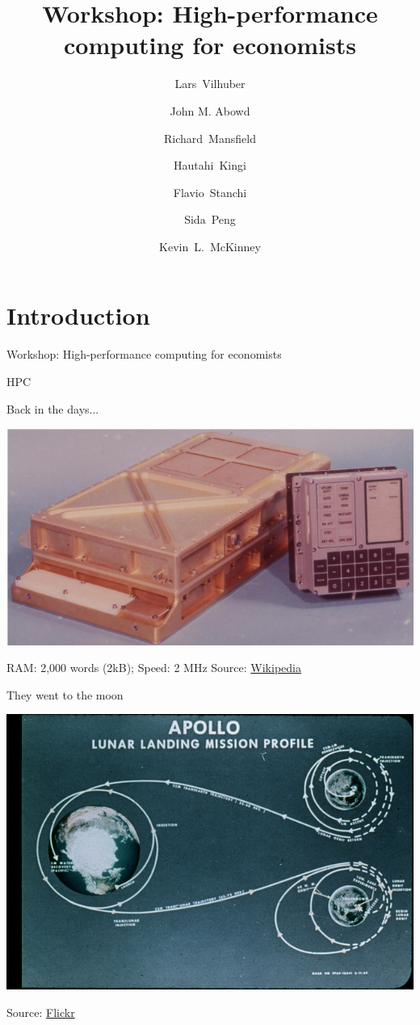 \documentclass[xcolor=table,compress]{beamer}
\title[Computing for Economists]{Workshop: High-performance computing for economists}
\author[Vilhuber, Abowd, Mansfield, McKinney]{%
  Lars~Vilhuber\inst{1} \and
  John M. Abowd\inst{1} \and
  Richard~Mansfield\inst{1} \and
  Hautahi~Kingi\inst{1} \and
  Flavio~Stanchi\inst{1} \and
  Sida~Peng\inst{1} \and
  Kevin~L.~McKinney %
}
\institute[Cornell]{
  \inst{1}%
   Cornell University, Economics Department,
}%
\begin{document}
\frame{\titlepage}


\section[Intro]{Introduction}


\begin{frame}
Workshop: High-performance computing for economists
\end{frame}


\begin{frame}{HPC}
\begin{block}{Back in the days...}
\begin{center}
\includegraphics[height=0.6\textheight]{./Agc_view}
\end{center}
\end{block}
\pause
RAM: 2,000 words (2kB); Speed: 2 MHz
\newline
\tiny Source: \href{http://upload.wikimedia.org/wikipedia/commons/7/79/Agc_view.jpg}{Wikipedia}
\end{frame}

\begin{frame}{They went to the moon}
\begin{center}
\includegraphics[height=0.7\textheight]{./apollo-11-path}
\end{center}
\tiny Source:  \href{http://farm2.staticflickr.com/1208/5105040212_346b792ee5_z.jpg}{Flickr}
\end{frame}
\end{document}
